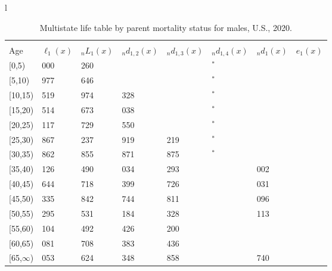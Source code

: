 \documentclass[
]{article}
\begin{document}
\begin{table}
\caption{\label{tab:table-male}Multistate life table by parent mortality status for males, U.S., 2020.}

\centering
\fontsize{9}{11}\selectfont
\begin{tabular}[t]{l}
\hline
\begin{tabular}{>{\raggedright\arraybackslash}p{.45in}>{\raggedleft\arraybackslash}p{.65in}>{\raggedleft\arraybackslash}p{.65in}>{\raggedleft\arraybackslash}p{.65in}>{\raggedleft\arraybackslash}p{.65in}>{\raggedleft\arraybackslash}p{.65in}>{\raggedleft\arraybackslash}p{.65in}>{\raggedleft\arraybackslash}p{.65in}}
\toprule
\multicolumn{1}{c}{ } & \multicolumn{7}{c}{(1) Lost neither} \\
\cmidrule(l{3pt}r{3pt}){2-8}
Age & $\ell_{1}(x)$ & ${}_nL_{1}(x)$ & ${}_nd_{1,2}(x)$ & ${}_nd_{1,3}(x)$ & ${}_nd_{1,4}(x)$ & ${}_nd_{1}(x)$ & $e_{1}(x)$\\
\midrule
{}[0,5) & 100 000 & 494 260 & 928 & 362 & 51$^{*}$ & 683 & 43\\
{}[5,10) & 97 977 & 486 646 & 985 & 402 & 12$^{*}$ & 59 & 39\\
{}[10,15) & 96 519 & 477 974 & 1 328 & 570 & 11$^{*}$ & 95 & 34\\
{}[15,20) & 94 514 & 464 673 & 2 038 & 943 & 27$^{*}$ & 388 & 29\\
{}[20,25) & 91 117 & 443 729 & 2 550 & 942 & 54$^{*}$ & 704 & 24\\
\addlinespace
{}[25,30) & 86 867 & 417 237 & 2 919 & 1 219 & 40$^{*}$ & 827 & 20\\
{}[30,35) & 81 862 & 383 855 & 3 871 & 1 875 & 51$^{*}$ & 939 & 16\\
{}[35,40) & 75 126 & 341 490 & 5 034 & 2 293 & 152 & 1 002 & 12\\
{}[40,45) & 66 644 & 285 718 & 6 399 & 2 726 & 154 & 1 031 & 9\\
{}[45,50) & 56 335 & 224 842 & 6 744 & 2 811 & 389 & 1 096 & 6\\
\addlinespace
{}[50,55) & 45 295 & 156 531 & 7 184 & 3 328 & 567 & 1 113 & 4\\
{}[55,60) & 33 104 & 92 492 & 6 426 & 3 200 & 399 & 998 & 2\\
{}[60,65) & 22 081 & 42 708 & 4 383 & 2 436 & 535 & 675 & 1\\
{}[65,$\infty$) & 14 053 & 29 624 & 3 348 & 1 858 & 763 & 1 740 & 0\\
\end{tabular}\\
\end{tabular}

\end{table}
\end{document}
